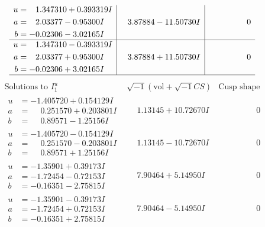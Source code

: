 \documentclass[1p]{elsarticle_modified}
\theoremstyle{definition}
\newcommand{\I}{\sqrt{-1}}
\begin{document}
$$\begin{array}{c|c|c}
\begin{aligned}
u &= \phantom{-}1.347310 + 0.393319 I \\
a &= \phantom{-}2.03377 - 0.95300 I \\
b &= -0.02306 - 3.02165 I\end{aligned}
 & \phantom{-}3.87884 - 11.50730 I & \phantom{-0.000000 } 0 \\ \hline\begin{aligned}
u &= \phantom{-}1.347310 - 0.393319 I \\
a &= \phantom{-}2.03377 + 0.95300 I \\
b &= -0.02306 + 3.02165 I\end{aligned}
 & \phantom{-}3.87884 + 11.50730 I & \phantom{-0.000000 } 0\\
 \hline 
 \end{array}$$\newpage$$\begin{array}{c|c|c}  
\text{Solutions to }I^u_{1}& \I (\text{vol} + \sqrt{-1}CS) & \text{Cusp shape}\\
 \hline 
\begin{aligned}
u &= -1.405720 + 0.154129 I \\
a &= \phantom{-}0.251570 + 0.203801 I \\
b &= \phantom{-}0.89571 - 1.25156 I\end{aligned}
 & \phantom{-}1.13145 + 10.72670 I & \phantom{-0.000000 } 0 \\ \hline\begin{aligned}
u &= -1.405720 - 0.154129 I \\
a &= \phantom{-}0.251570 - 0.203801 I \\
b &= \phantom{-}0.89571 + 1.25156 I\end{aligned}
 & \phantom{-}1.13145 - 10.72670 I & \phantom{-0.000000 } 0 \\ \hline\begin{aligned}
u &= -1.35901 + 0.39173 I \\
a &= -1.72454 - 0.72153 I \\
b &= -0.16351 - 2.75815 I\end{aligned}
 & \phantom{-}7.90464 + 5.14950 I & \phantom{-0.000000 } 0 \\ \hline\begin{aligned}
u &= -1.35901 - 0.39173 I \\
a &= -1.72454 + 0.72153 I \\
b &= -0.16351 + 2.75815 I\end{aligned}
 & \phantom{-}7.90464 - 5.14950 I & \phantom{-0.000000 } 0 \\ \hline\begin{aligned}

\end{aligned}
\end{array}$$
\end{document}
